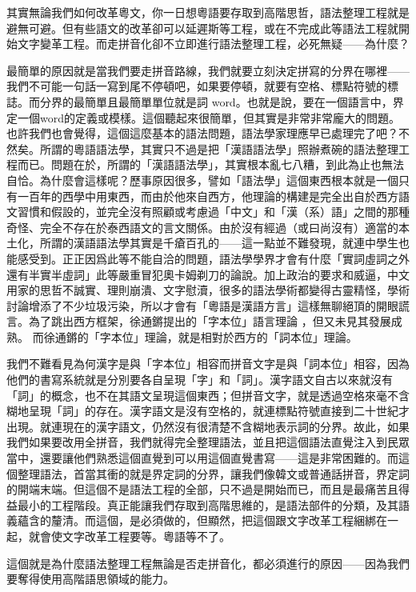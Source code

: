 \documentclass[a5paper, 12pt, openany]{book} %
\begin{document}
其實無論我們如何改革粵文，你一日想粵語要存取到高階思哲，語法整理工程就是避無可避。但有些語文的改革卻可以延遲斯等工程，或在不完成此等語法工程就開始文字變革工程。而走拼音化卻不立即進行語法整理工程，必死無疑——為什麼？

最簡單的原因就是當我們要走拼音路線，我們就要立刻決定拼寫的分界在哪裡——我們不可能一句話一寫到尾不停頓吧，如果要停頓，就要有空格、標點符號的標誌。而分界的最簡單且最簡單單位就是詞 word。也就是說，要在一個語言中，界定一個word的定義或模樣。這個聽起來很簡單，但其實是非常非常龐大的問題。也許我們也會覺得，這個這麼基本的語法問題，語法學家理應早已處理完了吧？不然矣。所謂的粵語語法學，其實只不過是把「漢語語法學」照辦煮碗的語法整理工程而已。問題在於，所謂的「漢語語法學」，其實根本亂七八糟，到此為止也無法自恰。為什麼會這樣呢？歷事原因很多，譬如「語法學」這個東西根本就是一個只有一百年的西學中用東西，而由於他來自西方，他理論的構建是完全出自於西方語文習慣和假設的，並完全沒有照顧或考慮過「中文」和「漢（系）語」之間的那種奇怪、完全不存在於泰西語文的言文關係。由於沒有經過（或曰尚沒有）適當的本土化，所謂的漢語語法學其實是千瘡百孔的——這一點並不難發現，就連中學生也能感受到。正正因爲此等不能自洽的問題，語法學學界才會有什麼「實詞虛詞之外還有半實半虛詞」此等嚴重冒犯奧卡姆剃刀的論說。加上政治的要求和威逼，中文用家的思哲不誠實、理則崩潰、文字慰瀆，很多的語法學術都變得古靈精怪，學術討論增添了不少垃圾污染，所以才會有「粵語是漢語方言」這樣無聊絕頂的開眼謊言。為了跳出西方框架，徐通鏘提出的「字本位」語言理論 ，但又未見其發展成熟。 而徐通鏘的「字本位」理論，就是相對於西方的「詞本位」理論。

我們不難看見為何漢字是與「字本位」相容而拼音文字是與「詞本位」相容，因為他們的書寫系統就是分別要各自呈現「字」和「詞」。漢字語文自古以來就沒有「詞」的概念，也不在其語文呈現這個東西；但拼音文字，就是透過空格來毫不含糊地呈現「詞」的存在。漢字語文是沒有空格的，就連標點符號直接到二十世紀才出現。就連現在的漢字語文，仍然沒有很清楚不含糊地表示詞的分界。故此，如果我們如果要改用全拼音，我們就得完全整理語法，並且把這個語法直覺注入到民眾當中，還要讓他們熟悉這個直覺到可以用這個直覺書寫——這是非常困難的。而這個整理語法，首當其衝的就是界定詞的分界，讓我們像韓文或普通話拼音，界定詞的開端末端。但這個不是語法工程的全部，只不過是開始而已，而且是最痛苦且得益最小的工程階段。真正能讓我們存取到高階思維的，是語法部件的分類，及其語義蘊含的釐清。而這個，是必須做的，但顯然，把這個跟文字改革工程綑綁在一起，就會使文字改革工程要等。粵語等不了。

這個就是為什麼語法整理工程無論是否走拼音化，都必須進行的原因——因為我們要奪得使用高階語思領域的能力。
\end{document}
